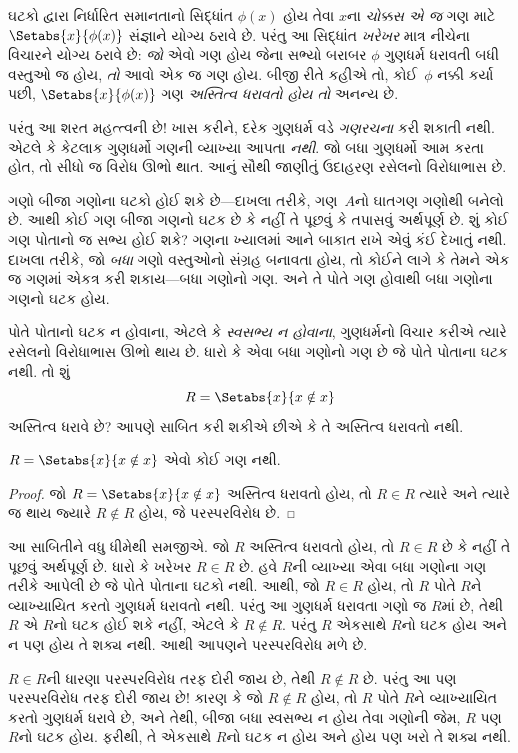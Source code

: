 \begingroup
\makeatletter{}\makeatother

\label{guunit:OLP-0010}


ઘટકો દ્વારા નિર્ધારિત સમાનતાનો સિદ્ધાંત $\phi(x)$ હોય તેવા $x$ના
\emph{ચોક્કસ એ જ} ગણ માટે $\Setabs{x}{\phi(x)}$ સંજ્ઞાને યોગ્ય ઠરાવે છે.
પરંતુ આ સિદ્ધાંત \emph{ખરેખર} માત્ર નીચેના વિચારને યોગ્ય ઠરાવે છે:
\emph{જો} એવો ગણ હોય જેના સભ્યો બરાબર $\phi$ ગુણધર્મ ધરાવતી બધી
વસ્તુઓ જ હોય, \emph{તો} આવો એક જ ગણ હોય.
બીજી રીતે કહીએ તો, કોઈ~$\phi$ નક્કી કર્યા પછી,
$\Setabs{x}{\phi(x)}$ ગણ \emph{અસ્તિત્વ ધરાવતો હોય તો} અનન્ય છે.

પરંતુ આ શરત મહત્ત્વની છે!{} ખાસ કરીને, દરેક ગુણધર્મ વડે
\emph{ગણરચના} કરી શકાતી નથી. એટલે કે કેટલાક ગુણધર્મો ગણની વ્યાખ્યા
આપતા \emph{નથી}. જો બધા ગુણધર્મો આમ કરતા હોત, તો સીધો જ
વિરોધ ઊભો થાત. આનું સૌથી જાણીતું ઉદાહરણ રસેલનો વિરોધાભાસ છે.

ગણો બીજા ગણોના ઘટકો હોઈ શકે છે---દાખલા તરીકે,
ગણ~$A$નો ઘાતગણ ગણોથી બનેલો છે.
આથી કોઈ ગણ બીજા ગણનો ઘટક છે કે નહીં તે પૂછવું કે તપાસવું અર્થપૂર્ણ છે.
શું કોઈ ગણ પોતાનો જ સભ્ય હોઈ શકે?
ગણના ખ્યાલમાં આને બાકાત રાખે એવું કંઈ દેખાતું નથી.
દાખલા તરીકે, જો \emph{બધા} ગણો વસ્તુઓનો સંગ્રહ બનાવતા હોય,
તો કોઈને લાગે કે તેમને એક જ ગણમાં એકત્ર કરી શકાય---બધા ગણોનો ગણ.
અને તે પોતે ગણ હોવાથી બધા ગણોના ગણનો ઘટક હોય.

પોતે પોતાનો ઘટક ન હોવાના, એટલે કે \emph{સ્વસભ્ય ન હોવાના},
ગુણધર્મનો વિચાર કરીએ ત્યારે રસેલનો વિરોધાભાસ ઊભો થાય છે.
ધારો કે એવા બધા ગણોનો ગણ છે જે પોતે પોતાના ઘટક નથી.
તો શું
\[
R = \Setabs{x}{x \notin x}
\]
અસ્તિત્વ ધરાવે છે? આપણે સાબિત કરી શકીએ છીએ કે તે અસ્તિત્વ ધરાવતો નથી.

\begin{thm}[રસેલનો વિરોધાભાસ]
	$R = \Setabs{x}{x \notin x}$ એવો કોઈ ગણ નથી.
\end{thm}

\begin{proof}
જો $R = \Setabs{x}{x \notin x}$ અસ્તિત્વ ધરાવતો હોય, તો
$R \in R$ ત્યારે અને ત્યારે જ થાય જ્યારે $R \notin R$ હોય,
જે પરસ્પરવિરોધ છે.
\end{proof}

\begin{explain}
આ સાબિતીને વધુ ધીમેથી સમજીએ. જો $R$ અસ્તિત્વ ધરાવતો હોય, તો
$R \in R$ છે કે નહીં તે પૂછવું અર્થપૂર્ણ છે.
ધારો કે ખરેખર $R \in R$ છે. હવે $R$ની વ્યાખ્યા એવા બધા ગણોના ગણ
તરીકે આપેલી છે જે પોતે પોતાના ઘટકો નથી.
આથી, જો $R \in R$ હોય, તો $R$ પોતે $R$ને વ્યાખ્યાયિત કરતો ગુણધર્મ ધરાવતો નથી.
પરંતુ આ ગુણધર્મ ધરાવતા ગણો જ $R$માં છે, તેથી $R$ એ $R$નો
ઘટક હોઈ શકે નહીં, એટલે કે $R \notin R$.
પરંતુ $R$ એકસાથે $R$નો ઘટક હોય અને ન પણ હોય તે શક્ય નથી.
આથી આપણને પરસ્પરવિરોધ મળે છે.

$R \in R$ની ધારણા પરસ્પરવિરોધ તરફ દોરી જાય છે, તેથી $R \notin R$ છે.
પરંતુ આ પણ પરસ્પરવિરોધ તરફ દોરી જાય છે!{}
કારણ કે જો $R \notin R$ હોય, તો $R$ પોતે $R$ને વ્યાખ્યાયિત કરતો ગુણધર્મ
ધરાવે છે, અને તેથી, બીજા બધા સ્વસભ્ય ન હોય તેવા ગણોની જેમ,
$R$ પણ $R$નો ઘટક હોય.
ફરીથી, તે એકસાથે $R$નો ઘટક ન હોય અને હોય પણ ખરો તે શક્ય નથી.
\end{explain}

